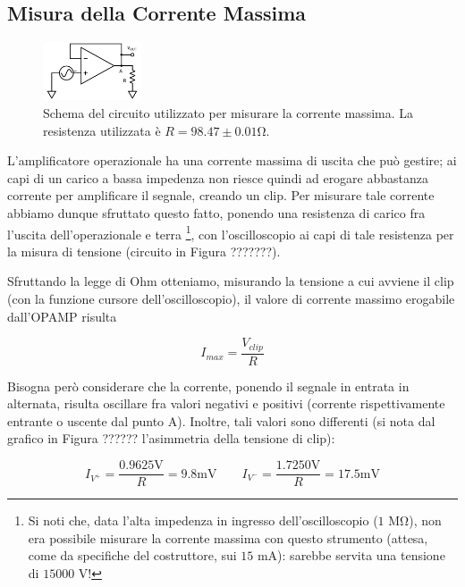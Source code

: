 \subsection{Misura della Corrente Massima}

\begin{figure}
  \begin{center}
    \includegraphics[width=0.26\textwidth]{../E03/latex/max_current.pdf}
  \end{center}
  \caption{Schema del circuito utilizzato per misurare la corrente massima. La resistenza utilizzata è $R=98.47\pm0.01$\si{\ohm}.}
  \label{cir2:max_current}
\end{figure}

L'amplificatore operazionale ha una corrente massima di uscita che può gestire; ai capi di un carico a bassa impedenza non riesce quindi ad erogare abbastanza corrente per amplificare il segnale, creando un clip. Per misurare tale corrente abbiamo dunque sfruttato questo fatto, ponendo una resistenza di carico fra l'uscita dell'operazionale e terra \footnote{Si noti che, data l'alta impedenza in ingresso dell'oscilloscopio ($1$ \si{\mega\ohm}), non era possibile misurare la corrente massima con questo strumento (attesa, come da specifiche del costruttore, sui $15$ \si{\milli\ampere}): sarebbe servita una tensione di $15000$ \si{\volt}!}, con l'oscilloscopio ai capi di tale resistenza per la misura di tensione (circuito in Figura ???????).

Sfruttando la legge di Ohm otteniamo, misurando la tensione a cui avviene il clip (con la funzione cursore dell'oscilloscopio), il valore di corrente massimo erogabile dall'OPAMP risulta

$$I_{max} = \frac{V_{clip}}{R}$$

Bisogna però considerare che la corrente, ponendo il segnale in entrata in alternata, risulta oscillare fra valori negativi e positivi (corrente rispettivamente entrante o uscente dal punto A). Inoltre, tali valori sono differenti (si nota dal grafico in Figura ?????? l'asimmetria della tensione di clip):

$$I_{V^+} = \frac{0.9625 \si{\volt}}{R} = 9.8 \si{\milli\volt}  \qquad I_{V^-} = \frac{1.7250 \si{\volt}}{R} = 17.5 \si{\milli\volt}$$